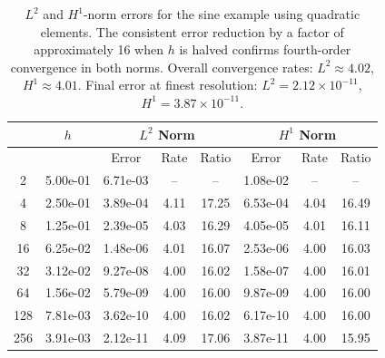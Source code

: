 \begin{table}[ht]
	\centering
	\begin{tabular}{|c|c|c|c|c|c|c|c|}
		\hline
		\rowcolor{blue!25!white} 
		\multicolumn{1}{|c|}{$M$} & \multicolumn{1}{c|}{$h$} & \multicolumn{3}{c|}{$L^2$ Norm} & \multicolumn{3}{c|}{$H^1$ Norm} \\
		\hline
		\rowcolor{blue!25!white} 
		& & Error & Rate & Ratio & Error & Rate & Ratio \\
		\hline
		2 & 5.00e-01 & 6.71e-03 & -- & -- & 1.08e-02 & -- & -- \\
		\rowcolor{blue!5!white}
		4 & 2.50e-01 & 3.89e-04 & 4.11 & 17.25 & 6.53e-04 & 4.04 & 16.49 \\
		8 & 1.25e-01 & 2.39e-05 & 4.03 & 16.29 & 4.05e-05 & 4.01 & 16.11 \\
		\rowcolor{blue!5!white}
		16 & 6.25e-02 & 1.48e-06 & 4.01 & 16.07 & 2.53e-06 & 4.00 & 16.03 \\
		32 & 3.12e-02 & 9.27e-08 & 4.00 & 16.02 & 1.58e-07 & 4.00 & 16.01 \\
		\rowcolor{blue!5!white}
		64 & 1.56e-02 & 5.79e-09 & 4.00 & 16.00 & 9.87e-09 & 4.00 & 16.00 \\
		128 & 7.81e-03 & 3.62e-10 & 4.00 & 16.02 & 6.17e-10 & 4.00 & 16.00 \\
		\rowcolor{blue!5!white}
		256 & 3.91e-03 & 2.12e-11 & 4.09 & 17.06 & 3.87e-11 & 4.00 & 15.95 \\
		\hline
	\end{tabular}
	\caption{$L^2$ and $H^1$-norm errors for the sine example using quadratic elements. The consistent error reduction by a factor of approximately 16 when $h$ is halved confirms fourth-order convergence in both norms. Overall convergence rates: $L^2 \approx 4.02$, $H^1 \approx 4.01$. Final error at finest resolution: $L^2 = 2.12 \times 10^{-11}$, $H^1 = 3.87 \times 10^{-11}$.}
	\label{tab:convergence_1}
\end{table}

